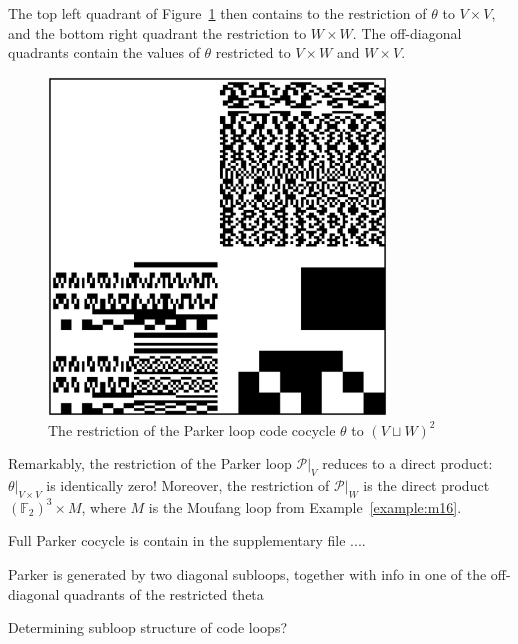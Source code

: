 \documentclass{article}
\theoremstyle{plain}
\theoremstyle{definition}
\def \cP {\mathcal{P}}
\def \FF {\mathbb{F}}
\begin{document}
The top left quadrant of Figure~\ref{fig:Parker cocycle} then contains to the restriction of $\theta$ to $V\times V$, and the bottom right quadrant the restriction to $W\times W$. 
The off-diagonal quadrants contain the values of $\theta$ restricted to $V\times W$ and $W\times V$.

\begin{figure}[h]
\begin{center}
\includegraphics[width=0.8\textwidth]{alpha_awesum.png}
\end{center}
\caption{The restriction of the Parker loop code cocycle $\theta$ to $(V\sqcup W)^2$}
\label{fig:Parker cocycle}
\end{figure}

Remarkably, the restriction of the Parker loop $\cP\big|_V$ reduces to a direct product: $\theta\big|_{V\times V}$ is identically zero! Moreover, the restriction of $\cP\big|_W$ is the direct product $(\FF_2)^3 \times M$, where $M$ is the Moufang loop from Example~\ref{example:m16}.

Full Parker cocycle is contain in the supplementary file ....


Parker is generated by two diagonal subloops, together with info in one of the off-diagonal quadrants of the restricted theta

Determining subloop structure of code loops?
\end{document}
